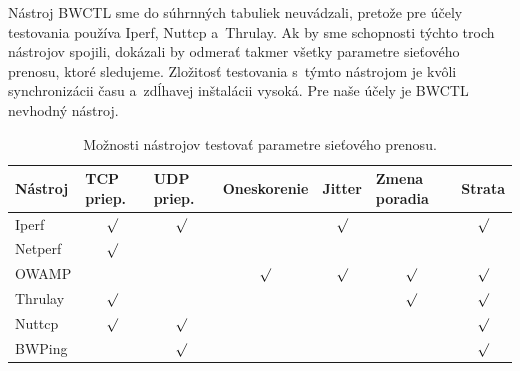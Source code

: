     Nástroj BWCTL sme do súhrnných tabuliek neuvádzali, pretože pre účely
    testovania používa Iperf, Nuttcp a~Thrulay. Ak by sme schopnosti týchto
    troch nástrojov spojili, dokázali by odmerať takmer všetky parametre sieťového 
    prenosu, ktoré sledujeme. Zložitosť testovania s~týmto nástrojom je kvôli
    synchronizácii času a~zdĺhavej inštalácii vysoká. Pre naše účely je BWCTL
    nevhodný nástroj.
    
    \begin{table}[h!]
        \begin{center}
            \begin{tabular}{|m{1.5cm}|m{1.4cm}|m{1.4cm}|m{2.6cm}|m{1.2cm}|m{1.7cm}|m{1.4cm}|}
                \hline
                 \textbf{Nástroj}  &  \textbf{TCP priep.} &
                 \textbf{UDP priep.} & \textbf{Oneskorenie} &
                 \textbf{Jitter} &
                 \textbf{Zmena poradia} & 
                 \textbf{Strata}\\ 
                \hline
                Iperf &\multicolumn{1}{c|}{$\surd$}&
                    \multicolumn{1}{c|}{$\surd$}&\multicolumn{1}{c|}{}&
                    \multicolumn{1}{c|}{$\surd$}&\multicolumn{1}{c|}{} &
                    \multicolumn{1}{c|}{$\surd$} \\
                Netperf &\multicolumn{1}{c|}{$\surd$}&
                    \multicolumn{1}{c|}{}&\multicolumn{1}{c|}{}&
                    \multicolumn{1}{c|}{}&\multicolumn{1}{c|}{} &
                    \multicolumn{1}{c|}{} \\
                OWAMP &\multicolumn{1}{c|}{}&
                    \multicolumn{1}{c|}{}&\multicolumn{1}{c|}{$\surd$}&
                    \multicolumn{1}{c|}{$\surd$}&\multicolumn{1}{c|}{$\surd$} &
                    \multicolumn{1}{c|}{$\surd$} \\
                Thrulay &\multicolumn{1}{c|}{$\surd$}&
                    \multicolumn{1}{c|}{}&\multicolumn{1}{c|}{}&
                    \multicolumn{1}{c|}{}&\multicolumn{1}{c|}{$\surd$} &
                    \multicolumn{1}{c|}{$\surd$} \\
                Nuttcp &\multicolumn{1}{c|}{$\surd$}&
                    \multicolumn{1}{c|}{$\surd$}&\multicolumn{1}{c|}{}&
                    \multicolumn{1}{c|}{}&\multicolumn{1}{c|}{} &
                    \multicolumn{1}{c|}{$\surd$} \\
                BWPing &\multicolumn{1}{c|}{}&
                    \multicolumn{1}{c|}{$\surd$}&\multicolumn{1}{c|}{}&
                    \multicolumn{1}{c|}{}&\multicolumn{1}{c|}{} &
                    \multicolumn{1}{c|}{$\surd$} \\
                    \hline
            \end{tabular}
            \caption{Možnosti nástrojov testovať parametre sieťového prenosu.} 
            \label{tab_zhod_param}
        \end{center}
    \end{table}

